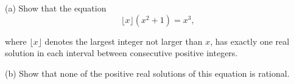 (a) Show that the equation\[\lfloor x \rfloor (x^2 + 1) = x^3,\]

where $\lfloor x \rfloor$ denotes the largest integer not larger than $x$,  has exactly one real solution in each interval between consecutive positive integers.

(b) Show that none of the positive real solutions of this equation is rational.